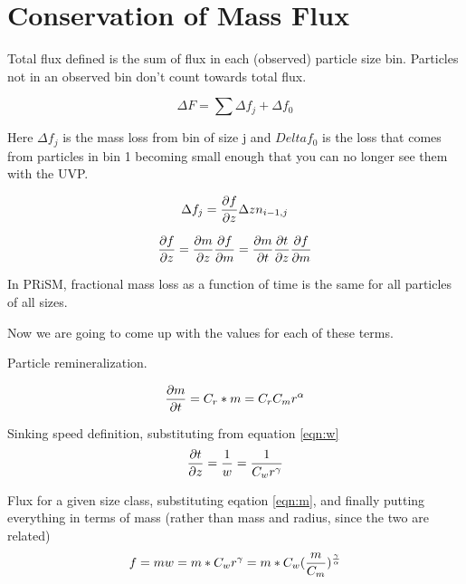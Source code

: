 \documentclass[a4paper,12pt]{article}
\begin{document}
\section{Conservation of Mass Flux}



Total flux defined is the sum of flux in each (observed) particle size bin. Particles not in an observed bin don't count towards total flux.

\begin{equation}
\Delta F = \sum \Delta f_j + \Delta f_0
\label{eqn:df}
\end{equation}

Here $\Delta f_j$ is the mass loss from bin of size j and $Delta f_0$ is the loss that comes from particles in bin 1 becoming small enough that you can no longer see them with the UVP.

\begin{equation}
\Delta f_j = {{\partial f} \over {\partial z}} \Delta z n_{i-1,j}
\label{eqn:dfj}
\end{equation}


\begin{equation}
{{\partial f} \over {\partial z}} = 
{{\partial m} \over {\partial z}} {{\partial f} \over {\partial m}} = 
{{\partial m} \over {\partial t}} 
{{\partial t} \over {\partial z}} 
{{\partial f} \over {\partial m}}
\label{eqn:dfdz}
\end{equation}

In PRiSM, fractional mass loss as a function of time is the same for all particles of all sizes.

\medskip

Now we are going to come up with the values for each of these terms.

\medskip

Particle remineralization.

\begin{equation}
{{\partial m} \over {\partial t}} = C_r * m = C_r  C_m r^\alpha
\label{eqn:dmdt}
\end{equation}

Sinking speed definition, substituting from equation \ref{eqn:w}
\begin{equation}
{{\partial t} \over {\partial z}} = {1 \over w} = {1 \over C_w r^\gamma}
\label{eqn:dtdz}
\end{equation}

Flux for a given size class, substituting eqation \ref{eqn:m}, and finally putting everything in terms of mass (rather than mass and radius, since the two are related)
\begin{equation}
f = m w = m * C_w r^\gamma = m * C_w ({m\over C_m})^{\gamma \over \alpha}
\label{eqn:f}
\end{equation}
\end{document}
